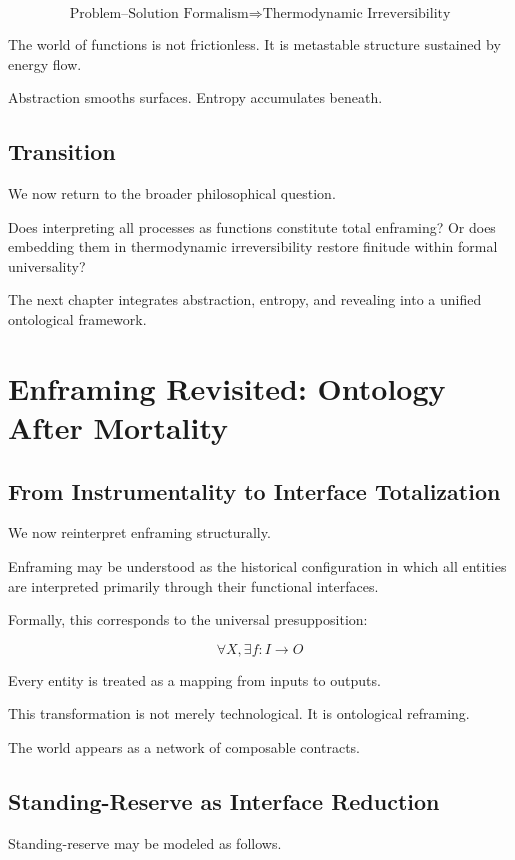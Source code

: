\documentclass[11pt,openany]{book}
\begin{document}
\[
\text{Problem--Solution Formalism} 
\Rightarrow 
\text{Thermodynamic Irreversibility}
\]

The world of functions is not frictionless.
It is metastable structure sustained by energy flow.

Abstraction smooths surfaces.
Entropy accumulates beneath.

\section{Transition}

We now return to the broader philosophical question.

Does interpreting all processes as functions constitute total enframing?
Or does embedding them in thermodynamic irreversibility 
restore finitude within formal universality?

The next chapter integrates abstraction, entropy, and revealing 
into a unified ontological framework.
\chapter{Enframing Revisited: Ontology After Mortality}

\section{From Instrumentality to Interface Totalization}

We now reinterpret enframing structurally.

Enframing may be understood as the historical configuration 
in which all entities are interpreted primarily through their functional interfaces.

Formally, this corresponds to the universal presupposition:

\[
\forall X, \exists f : I \to O
\]

Every entity is treated as a mapping from inputs to outputs.

This transformation is not merely technological.
It is ontological reframing.

The world appears as a network of composable contracts.

\section{Standing-Reserve as Interface Reduction}

Standing-reserve may be modeled as follows.
\end{document}
